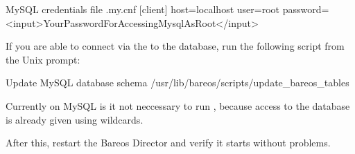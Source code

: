 \begin{config}{MySQL credentials file .my.cnf}
[client]
host=localhost
user=root
password=<input>YourPasswordForAccessingMysqlAsRoot</input>
\end{config}

If you are able to connect via the  to the database, run the following script from the Unix prompt:
\begin{commands}{Update MySQL database schema}
/usr/lib/bareos/scripts/update_bareos_tables
\end{commands}

Currently on MySQL is it not neccessary to run , because access to the database is already given using wildcards.

After this, restart the Bareos Director and verify it starts without problems.
